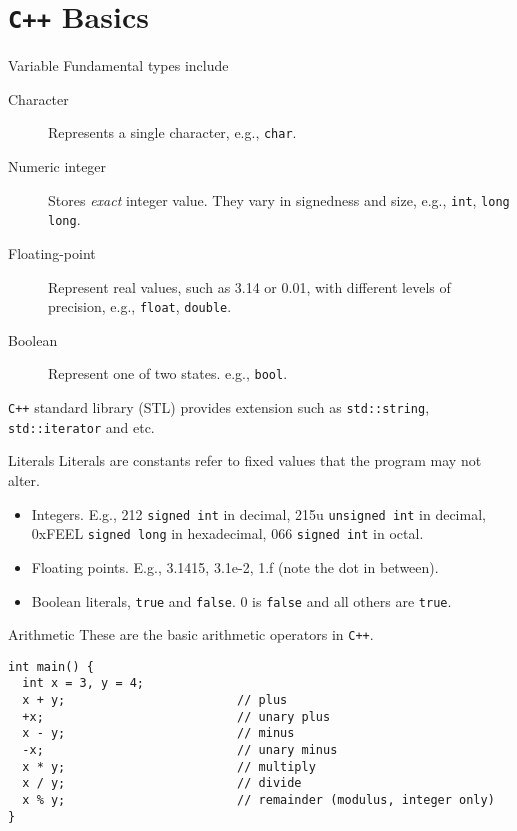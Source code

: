 \documentclass[presentation]{beamer}
\begin{document}
\section{\texttt{C++} Basics}
\label{sec:orgheadline32}

\begin{frame}[fragile,label={sec:orgheadline13}]{Variable}
 Fundamental types include

\begin{description}
\item[{Character}] Represents a single character, e.g., \texttt{char}.
\item[{Numeric integer}] Stores \emph{exact} integer value.  They vary in
signedness and size, e.g., \texttt{int}, \texttt{long long}.
\item[{Floating-point}] Represent real values, such as 3.14 or 0.01,
with different levels of precision, e.g., \texttt{float}, \texttt{double}.
\item[{Boolean}] Represent one of two states. e.g., \texttt{bool}.
\end{description}


\texttt{C++} standard library (STL) provides extension such as
\texttt{std::string}, \texttt{std::iterator} and etc.
\end{frame}

\begin{frame}[fragile,label={sec:orgheadline14}]{Literals}
 Literals are constants refer to fixed values that the program may
not alter.

\begin{itemize}
\item Integers.  E.g., 212 \texttt{signed int} in decimal, 215u \texttt{unsigned
     int} in decimal, 0xFEEL \texttt{signed long} in hexadecimal, 066
\texttt{signed int} in octal.
\item Floating points.  E.g., 3.1415, 3.1e-2, 1.f (note the dot in
between).
\item Boolean literals, \texttt{true} and \texttt{false}.  0 is \texttt{false} and all
others are \texttt{true}.
\end{itemize}
\end{frame}

\begin{frame}[fragile,label={sec:orgheadline15}]{Arithmetic}
 These are the basic arithmetic operators in \texttt{C++}.

\begin{verbatim}
int main() {
  int x = 3, y = 4;
  x + y;                        // plus
  +x;                           // unary plus
  x - y;                        // minus
  -x;                           // unary minus
  x * y;                        // multiply
  x / y;                        // divide
  x % y;                        // remainder (modulus, integer only)
}
\end{verbatim}
\end{frame}
\end{document}
